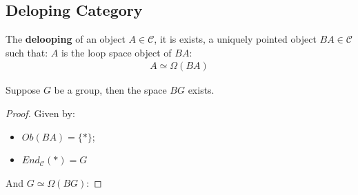 \documentclass[Total.tex]{subfiles}
\begin{document}
			\subsection{Deloping Category}
				\begin{Def}
					The \textbf{delooping} of an object $A\in \mathcal{C}$, it is exists, a uniquely pointed object $BA\in \mathcal{C}$ such that: $A$ is the loop space object of $BA$:
					\begin{gather*}
						A\simeq \Omega(BA)
					\end{gather*}
				\end{Def}
				
				\begin{proposition}
					Suppose $G$ be a group, then the space $BG$ exists.
				\end{proposition}
				\begin{proof}
					Given by:
					\begin{itemize}
						\item $Ob(BA)=\{*\}$;
						\item $End_\mathcal{C}(*)=G$
					\end{itemize}
					
					And $G\simeq \Omega(BG)$: 
				\end{proof}
				
\end{document}
